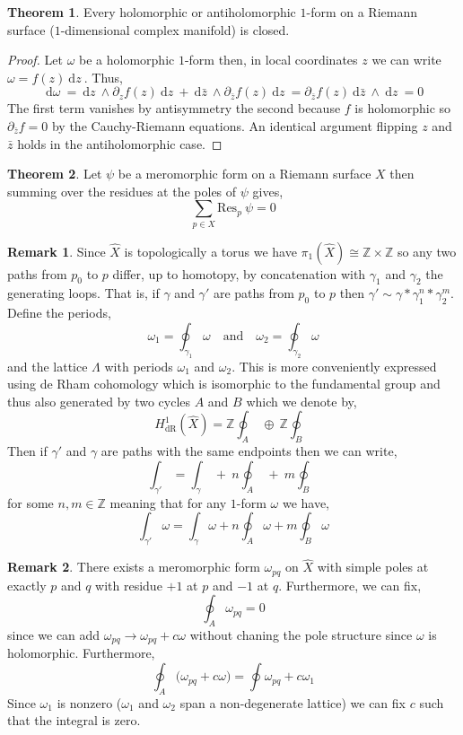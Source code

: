 \documentclass[12pt]{extarticle}
\newcommand{\Z}{\mathbb{Z}}
\renewcommand{\d}[1]{\: \mathrm{d}#1 \:}
\theoremstyle{definition}
\newtheorem{theorem}{Theorem}[section]
\newtheorem{remark}{Remark}
\newcommand{\Res}[2]{\mathrm{Res}_{#1} \: #2}
\begin{document}
\begin{theorem}
Every holomorphic or antiholomorphic $1$-form on a Riemann surface ($1$-dimensional complex manifold) is closed. 
\end{theorem}

\begin{proof}
Let $\omega$ be a holomorphic $1$-form then, in local coordinates $z$ we can write $\omega = f(z) \d{z}$. Thus,
\[ \d{\omega} = \d{z} \wedge \partial_z f(z) \d{z} + \d{\bar{z}} \wedge \partial_{\bar{z}} f(z) \d{z} = \partial_{\bar{z}} f(z) \d{\bar{z}} \wedge \d{z} = 0 \]
The first term vanishes by antisymmetry the second because $f$ is holomorphic so $\partial_{\bar{z}} f = 0$ by the Cauchy-Riemann equations. An identical argument flipping $z$ and $\bar{z}$ holds in the antiholomorphic case. 
\end{proof}

\begin{theorem}
Let $\psi$ be a meromorphic form on a Riemann surface $X$ then summing over the residues at the poles of $\psi$ gives,
\[ \sum_{p \in X} \Res{p}{\psi} = 0 \]
\end{theorem}


\begin{remark}
 Since $\hat{X}$ is topologically a torus we have $\pi_1(\hat{X}) \cong \Z \times \Z$ so any two paths from $p_0$ to $p$ differ, up to homotopy, by concatenation with $\gamma_1$ and $\gamma_2$ the generating loops. That is, if $\gamma$ and $\gamma'$ are paths from $p_0$ to $p$ then $\gamma' \sim \gamma * \gamma_1^n * \gamma_2^m$. Define the periods,
\[ \omega_1 = \oint_{\gamma_1} \omega \quad \text{and} \quad \omega_2 = \oint_{\gamma_2} \omega \]
and the lattice $\Lambda$ with periods $\omega_1$ and $\omega_2$. This is more conveniently expressed using de Rham cohomology which is isomorphic to the fundamental group and thus also generated by two cycles $A$ and $B$ which we denote by,
\[ H^1_{\text{dR}}(\hat{X}) = \Z \oint_A \: \oplus \:   \Z \oint_B \]
Then if $\gamma'$ and $\gamma$ are paths with the same endpoints then we can write,
\[ \int_{\gamma'} = \int_\gamma \: + \:  n \oint_A \: + \: m \oint_B \]
for some $n, m \in \Z$ meaning that for any $1$-form $\omega$ we have,
\[ \int_{\gamma'} \omega = \int_\gamma \omega +  n \oint_A \omega+ m \oint_B \omega \]
\end{remark}

\begin{remark}
There exists a meromorphic form $\omega_{pq}$ on $\hat{X}$ with simple poles at exactly $p$ and $q$ with residue $+1$ at $p$ and $-1$ at $q$. Furthermore, we can fix,
\[ \oint_A \omega_{pq} = 0 \]
since we can add $\omega_{pq} \to \omega_{pq} + c \omega$ without chaning the pole structure since $\omega$ is holomorphic. Furthermore,
\[ \oint_A \Big( \omega_{pq} + c \omega \Big) = \oint \omega_{pq} + c \omega_1 \]
Since $\omega_1$ is nonzero ($\omega_1$ and $\omega_2$ span a non-degenerate lattice) we can fix $c$ such that the integral is zero. 
\end{remark}
\end{document}
